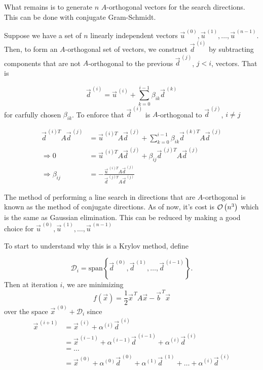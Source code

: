 What remains is to generate $n$ $A$-orthogonal vectors for the search directions. This can be done with conjugate Gram-Schmidt.

Suppose we have a set of $n$ linearly independent vectors
$ \vec{u}^{\,(0)}, \vec{u}^{\,(1)}, \ldots, \vec{u}^{\,(n-1)} $. Then, to form an $A$-orthogonal set of vectors, we construct $\vec{d}^{\,(i)}$ by subtracting components that are not $A$-orthogonal to the previous $\vec{d}^{\,(j)}$, $j<i$, vectors. That is

\begin{equation*}
    \vec{d}^{\,(i)} = \vec{u}^{\,(i)}
    + \sum_{k=0}^{i-1}\beta_{ik}\vec{d}^{\,(k)}
\end{equation*}
for carfully chosen $\beta_{ik}$. To enforce that $\vec{d}^{\,(i)}$ is $A$-orthogonal to $\vec{d}^{\,(j)}$, $i\neq j$

\begin{align*}
    \vec{d}^{\,(i)T}A\vec{d}^{\,(j)}  &= \vec{u}^{\,(i)T}A\vec{d}^{\,(j)}
    + \sum_{k=0}^{i-1}\beta_{ik}\vec{d}^{\,(k)T}A\vec{d}^{\,(j)} \\
    \Rightarrow 0 &=  \vec{u}^{\,(i)T}A\vec{d}^{\,(j)}
    + \beta_{ij}\vec{d}^{\,(j)T}A\vec{d}^{\,(j)} \\
    \Rightarrow \beta_{ij} &= -\frac{\vec{u}^{\,(i)T}A\vec{d}^{\,(j)}}{\vec{d}^{\,(j)T}A\vec{d}^{\,(j)}}
\end{align*}


The method of performing a line search in directions that are $A$-orthogonal is known as
the method of conjugate directions. As of now, it's cost is $\mathcal{O}\left(n^3\right)$ which is the same as Gaussian elimination. This can be reduced by making a good choice for $\vec{u}^{\,(0)}, \vec{u}^{\,(1)}, \ldots, \vec{u}^{\,(n-1)}$


To start to understand why this is a Krylov method, define

\begin{equation*}
    \mathcal{D}_i = \text{span}\left\{ \vec{d}^{\,(0)}, \vec{d}^{\,(1)}, \ldots, \vec{d}^{\,(i-1)}\right\}.
\end{equation*}
Then at iteration $i$, we are minimizing
\begin{equation*}
    f(\vec{x}) = \frac{1}{2}\vec{x}^{\,T}A\vec{x} - \vec{b}^{\,T}\vec{x}
\end{equation*}
over the space $\vec{x}^{\,(0)} + \mathcal{D}_i$ since
\begin{align*}
    \vec{x}^{\,(i+1)} &= \vec{x}^{\,(i)} + \alpha^{(i)}\vec{d}^{\,(i)} \\
    &= \vec{x}^{\,(i-1)} + \alpha^{(i-1)}\vec{d}^{\,(i-1)} + \alpha^{(i)}\vec{d}^{\,(i)} \\
    &= \ldots \\
    &= \vec{x}^{\,(0)} + \alpha^{(0)}\vec{d}^{\,(0)} + \alpha^{(1)}\vec{d}^{\,(1)} + \ldots + \alpha^{(i)}\vec{d}^{\,(i)}
\end{align*}

